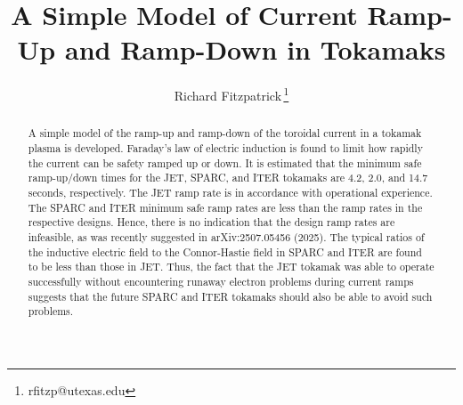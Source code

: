 \documentclass[12pt,prb,aps]{revtex4-1}
\begin{document}
\title{A Simple Model of Current Ramp-Up and Ramp-Down in Tokamaks}
\author{Richard Fitzpatrick\,\footnote{rfitzp@utexas.edu}}

\begin{abstract}
A simple model of the ramp-up and ramp-down of the toroidal current in a tokamak plasma is developed. Faraday's law of electric induction
is found to limit how rapidly the current can be safety ramped up or down. It is estimated that the minimum safe ramp-up/down times for the JET, SPARC, and
ITER tokamaks are 4.2, 2.0, and 14.7 seconds, respectively. The JET ramp rate is in accordance with operational experience. The SPARC
and ITER minimum safe ramp rates are less than the ramp rates in the respective designs. Hence, there is no indication that the design ramp rates are infeasible, as was recently 
suggested  in arXiv:2507.05456 (2025).
The typical ratios of the inductive electric field
to the Connor-Hastie field in SPARC and ITER are found to be less than those in JET. Thus, the fact that the JET tokamak was able to operate successfully
without encountering runaway electron problems during current ramps suggests that the future SPARC and ITER tokamaks should also be able to
avoid such problems. 
\end{abstract}
\maketitle
\end{document}

